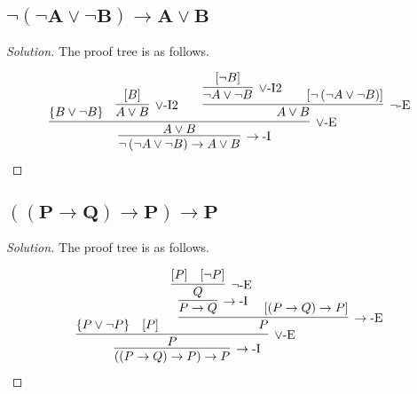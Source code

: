 \documentclass{article}
\newenvironment{solution}{\begin{proof}[\noindent\it Solution]}{\end{proof}}
\begin{document}
\subsection{$\boldsymbol{\neg\left(\neg A\lor\neg B\right)\to A\lor B}$}
\vspace{1em}
\begin{solution}
    The proof tree is as follows.

    \vspace{-1.5em}
    \begin{align*}
        \infer[\to\text{-I}]
        {\neg\left(\neg A\lor\neg B\right)\to A\lor B}
        {
            \infer[\lor\text{-E}]
            {A\lor B}
            {
                \left\{B\lor\neg B\right\}
                &
                \infer[\lor\text{-I2}]
                {A\lor B}
                {[B]}
                &
                \quad
                \infer[\neg\text{-E}]
                {
                    A\lor B
                }
                {
                    \infer[\lor\text{-I2}]
                    {\neg A\lor\neg B}
                    {[\neg B]}
                    &
                    \quad
                    [\neg\left(\neg A\lor\neg B\right)]
                }
            }
        }
    \end{align*}

\vspace{-3.3em}
\end{solution}

\vspace{1em}
\subsection{$\boldsymbol{\left(\left(P\to Q\right)\to P\right)\to P}$}
\vspace{1em}
\begin{solution}
    The proof tree is as follows.

    \vspace{-1.5em}
    \begin{align*}
        \infer[\to\text{-I}]
        {\left(\left(P\to Q\right)\to P\right)\to P}
        {
            \infer[\lor\text{-E}]
            {P}
            {
                \left\{P\lor\neg P\right\}
                &
                [P]
                &
                \infer[\to\text{-E}]
                {P}
                {
                    \infer[\to\text{-I}]
                    {P\to Q}
                    {
                        \infer[\neg\text{-E}]
                        {Q}
                        {[P] & [\neg P]}
                    }
                    & 
                    [\left(P\to Q\right)\to P]
                }
            }
        }
    \end{align*}

\vspace{-3.3em}
\end{solution}
\end{document}

